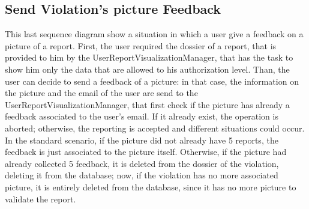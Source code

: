 \documentclass[../RASD.tex]{subfiles}
\begin{document}
    \subsection{Send Violation's picture Feedback}\label{subsec:send-violation's-picture-feedback}
    \begin{figure}[H]
    \end{figure}
    This last sequence diagram show a situation in which a user give a feedback on a picture of a report.
    First, the user required the dossier of a report, that is provided to him by the UserReportVisualizationManager,
    that has the task to show him only the data that are allowed to his authorization level.
    Than, the user can decide to send a feedback of a picture: in that case, the information on the picture and the email of the user
    are send to the UserReportVisualizationManager, that first check if the picture has already a feedback associated to the user’s email.
    If it already exist, the operation is aborted;
    otherwise, the reporting is accepted and different situations could occur.
    In the standard scenario, if the picture did not already have 5 reports, the feedback is just associated to the picture itself.
    Otherwise, if the picture had already collected 5 feedback, it is deleted from the dossier of the violation, deleting it from the database;
    now, if the violation has no more associated picture, it is entirely deleted from the database, since it has no more picture to validate the report.
    \newpage
\end{document}
